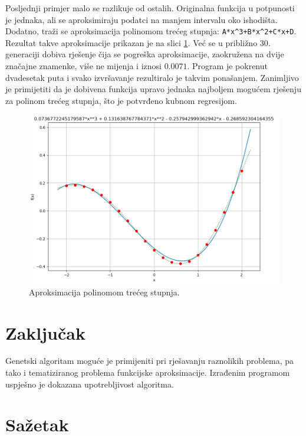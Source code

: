 \documentclass[times, utf8, seminar, numeric]{fer}
\begin{document}
Posljednji primjer malo se razlikuje od ostalih.
Originalna funkcija u potpunosti je jednaka, ali se aproksimiraju podatci na manjem intervalu oko ishodišta.
Dodatno, traži se aproksimacija polinomom trećeg stupnja: \texttt{A*x\textasciicircum 3+B*x\textasciicircum 2+C*x+D}.
Rezultat takve aproksimacije prikazan je na slici \ref{Graph_Poly}.
Već se u približno $30.$ generaciji dobiva rješenje čija se pogreška aproksimacije, zaokružena na dvije značajne znamenke, više ne mijenja i iznosi $0.0071$.
Program je pokrenut dvadesetak puta i svako izvršavanje rezultiralo je takvim ponašanjem.
Zanimljivo je primijetiti da je dobivena funkcija upravo jednaka najboljem mogućem rješenju za polinom trećeg stupnja, što je potvrđeno kubnom regresijom.

\begin{figure}[h]
	\centering
	\includegraphics[width=1\textwidth]{figures/Graph_Poly.png}
	\caption{\label{Graph_Poly}Aproksimacija polinomom trećeg stupnja.}
\end{figure}


\chapter{Zaključak}

Genetski algoritam moguće je primijeniti pri rješavanju raznolikih problema, pa tako i tematiziranog problema funkcijske aproksimacije.
Izrađenim programom uspješno je dokazana upotrebljivost algoritma.






\chapter{Sažetak}
\end{document}
